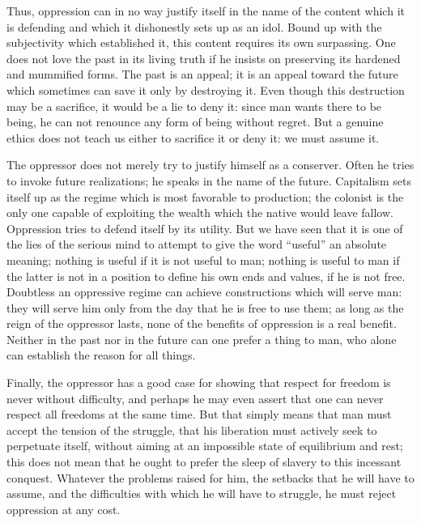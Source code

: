 \documentclass[11pt]{article}
\begin{document}
{{Thus, oppression can in no way justify itself in the name of the content which it is defending and which it dishonestly sets up as an idol. Bound up with the subjectivity which established it, this content requires its own surpassing. One does not love the past in its living truth if he insists on preserving its hardened and mummified forms. The past is an appeal; it is an appeal toward the future which sometimes can save it only by destroying it. Even though this destruction may be a sacrifice, it would be a lie to deny it: since man wants there to be being, he can not renounce any form of being without regret. But a genuine ethics does not teach us either to sacrifice it or deny it: we must assume it.

The oppressor does not merely try to justify himself as a conserver. Often he tries to invoke future realizations; he speaks in the name of the future. Capitalism sets itself up as the regime which is most favorable to production; the colonist is the only one capable of exploiting the wealth which the native would leave fallow. Oppression tries to defend itself by its utility. But we have seen that it is one of the lies of the serious mind to attempt to give the word “useful” an absolute meaning; nothing is useful if it is not useful to man; nothing is useful to man if the latter is not in a position to define his own ends and values, if he is not free. Doubtless an oppressive regime can achieve constructions which will serve man: they will serve him only from the day that he is free to use them; as long as the reign of the oppressor lasts, none of the benefits of oppression is a real benefit. Neither in the past nor in the future can one prefer a thing to man, who alone can establish the reason for all things.

Finally, the oppressor has a good case for showing that respect for freedom is never without difficulty, and perhaps he may even assert that one can never respect all freedoms at the same time. But that simply means that man must accept the tension of the struggle, that his liberation must actively seek to perpetuate itself, without aiming at an impossible state of equilibrium and rest; this does not mean that he ought to prefer the sleep of slavery to this incessant conquest. Whatever the problems raised for him, the setbacks that he will have to assume, and the difficulties with which he will have to struggle, he must reject oppression at any cost.
}}
\end{document}
